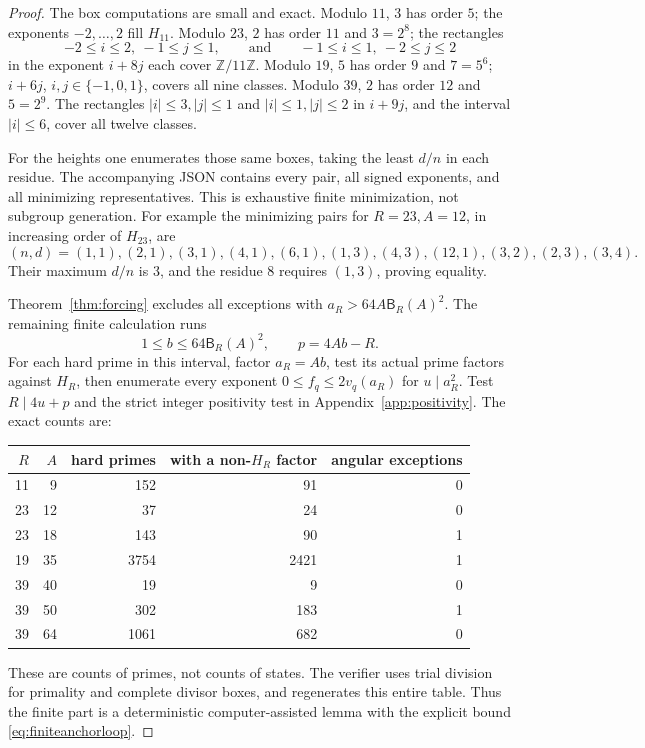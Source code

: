 \documentclass[11pt]{article}
\theoremstyle{definition}\newtheorem{definition}[theorem]{Definition}
\theoremstyle{remark}\newtheorem{remark}[theorem]{Remark}
\newcommand{\B}{\mathsf B}
\begin{document}
\begin{proof}
The box computations are small and exact. Modulo $11$, $3$ has order $5$; the exponents $-2,\ldots,2$ fill $H_{11}$. Modulo $23$, $2$ has order $11$ and $3=2^8$; the rectangles
\[
 -2\le i\le2,\ -1\le j\le1,
 \qquad\text{and}\qquad
 -1\le i\le1,\ -2\le j\le2
\]
in the exponent $i+8j$ each cover $\mathbb Z/11\mathbb Z$. Modulo $19$, $5$ has order $9$ and $7=5^6$; $i+6j$, $i,j\in\{-1,0,1\}$, covers all nine classes. Modulo $39$, $2$ has order $12$ and $5=2^9$. The rectangles $|i|\le3,|j|\le1$ and $|i|\le1,|j|\le2$ in $i+9j$, and the interval $|i|\le6$, cover all twelve classes.

For the heights one enumerates those same boxes, taking the least $d/n$ in each residue. The accompanying JSON contains every pair, all signed exponents, and all minimizing representatives. This is exhaustive finite minimization, not subgroup generation. For example the minimizing pairs for $R=23,A=12$, in increasing order of $H_{23}$, are
\[
 (n,d)=(1,1),(2,1),(3,1),(4,1),(6,1),(1,3),
 (4,3),(12,1),(3,2),(2,3),(3,4).
\]
Their maximum $d/n$ is $3$, and the residue $8$ requires $(1,3)$, proving equality.

Theorem~\ref{thm:forcing} excludes all exceptions with
$a_R>64A\B_R(A)^2$. The remaining finite calculation runs
\begin{equation}\label{eq:finiteanchorloop}
 1\le b\le64\B_R(A)^2,\qquad p=4Ab-R.
\end{equation}
For each hard prime in this interval, factor $a_R=Ab$, test its actual prime factors against $H_R$, then enumerate every exponent $0\le f_q\le2v_q(a_R)$ for $u\mid a_R^2$. Test $R\mid4u+p$ and the strict integer positivity test in Appendix~\ref{app:positivity}. The exact counts are:
\begin{center}
\begin{tabular}{rrrrr}
\toprule
$R$&$A$&hard primes&with a non-$H_R$ factor&angular exceptions\\
\midrule
11&9&152&91&0\\
23&12&37&24&0\\
23&18&143&90&1\\
19&35&3754&2421&1\\
39&40&19&9&0\\
39&50&302&183&1\\
39&64&1061&682&0\\
\bottomrule
\end{tabular}
\end{center}
These are counts of primes, not counts of states. The verifier uses trial division for primality and complete divisor boxes, and regenerates this entire table. Thus the finite part is a deterministic computer-assisted lemma with the explicit bound \eqref{eq:finiteanchorloop}.


\end{proof}
\end{document}
